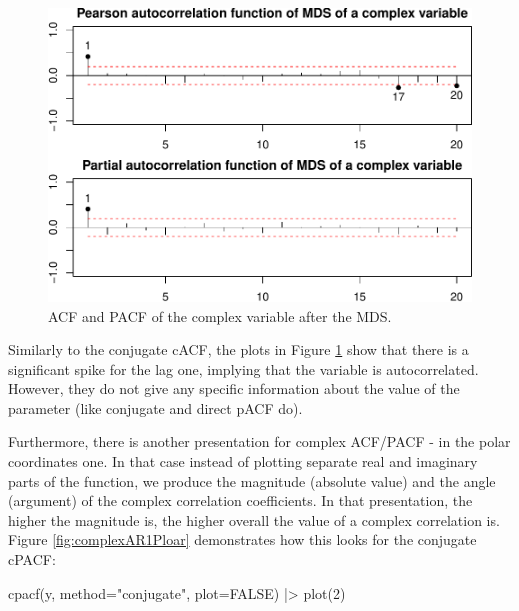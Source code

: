 \documentclass[
]{book}
\newenvironment{Shaded}{\begin{snugshade}}{\end{snugshade}}
\newcommand{\AttributeTok}[1]{\textcolor[rgb]{0.77,0.63,0.00}{#1}}
\newcommand{\ConstantTok}[1]{\textcolor[rgb]{0.00,0.00,0.00}{#1}}
\newcommand{\DecValTok}[1]{\textcolor[rgb]{0.00,0.00,0.81}{#1}}
\newcommand{\FunctionTok}[1]{\textcolor[rgb]{0.00,0.00,0.00}{#1}}
\newcommand{\NormalTok}[1]{#1}
\newcommand{\SpecialCharTok}[1]{\textcolor[rgb]{0.00,0.00,0.00}{#1}}
\newcommand{\StringTok}[1]{\textcolor[rgb]{0.31,0.60,0.02}{#1}}
\begin{document}
\begin{figure}
\centering
\includegraphics{Svetunkov---Svetunkov---Complex-Valued-Econometrics_files/figure-latex/complexAR1Pearson-1.pdf}
\caption{\label{fig:complexAR1Pearson}ACF and PACF of the complex variable after the MDS.}
\end{figure}

Similarly to the conjugate cACF, the plots in Figure \ref{fig:complexAR1Pearson} show that there is a significant spike for the lag one, implying that the variable is autocorrelated. However, they do not give any specific information about the value of the parameter (like conjugate and direct pACF do).

Furthermore, there is another presentation for complex ACF/PACF - in the polar coordinates one. In that case instead of plotting separate real and imaginary parts of the function, we produce the magnitude (absolute value) and the angle (argument) of the complex correlation coefficients. In that presentation, the higher the magnitude is, the higher overall the value of a complex correlation is. Figure \ref{fig:complexAR1Ploar} demonstrates how this looks for the conjugate cPACF:

\begin{Shaded}
\begin{Highlighting}[]
\FunctionTok{cpacf}\NormalTok{(y, }\AttributeTok{method=}\StringTok{"conjugate"}\NormalTok{, }\AttributeTok{plot=}\ConstantTok{FALSE}\NormalTok{) }\SpecialCharTok{|\textgreater{}}
    \FunctionTok{plot}\NormalTok{(}\DecValTok{2}\NormalTok{)}
\end{Highlighting}
\end{Shaded}
\end{document}

